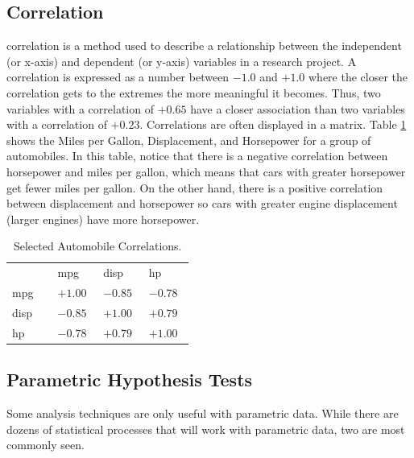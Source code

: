 \subsection{Correlation}

\Gls{correlation} is a method used to describe a relationship between the independent (or x-axis) and dependent (or y-axis) variables in a research project. A correlation is expressed as a number between $ -1.0 $ and $ +1.0 $ where the closer the correlation gets to the extremes the more meaningful it becomes. Thus, two variables with a correlation of $ +0.65 $ have a closer association than two variables with a correlation of $ +0.23 $. Correlations are often displayed in a matrix. Table \ref{tab06.06} shows the Miles per Gallon, Displacement, and Horsepower for a group of automobiles. In this table, notice that there is a negative correlation between horsepower and miles per gallon, which means that cars with greater horsepower get fewer miles per gallon. On the other hand, there is a positive correlation between displacement and horsepower so cars with greater engine displacement (larger engines) have more horsepower.

\begin{table}[H]
	\centering
	\begin{tabularx}{0.95\linewidth}{
			p{0.22\linewidth}
			p{0.22\linewidth}
			p{0.22\linewidth}
			p{0.22\linewidth}}
		\toprule
		{}   & mpg       & disp      & hp \\
		mpg  & $ +1.00 $ & $ -0.85 $ & $ -0.78 $ \\
		disp & $ -0.85 $ & $ +1.00 $ & $ +0.79 $ \\
		hp   & $ -0.78 $ & $ +0.79 $ & $ +1.00 $ \\
		\bottomrule
	\end{tabularx}
	\caption{Selected Automobile Correlations.}
	\label{tab06.06}
\end{table}


\subsection{Parametric Hypothesis Tests}

Some analysis techniques are only useful with \gls{parametric} data. While there are dozens of statistical processes that will work with parametric data, two are most commonly seen.

